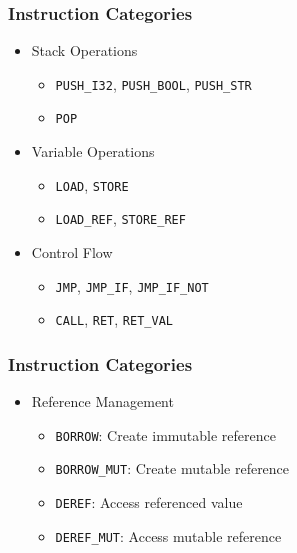 \documentclass{beamer}
\begin{document}
\begin{frame}
\frametitle{Instruction Categories}
\begin{itemize}
    \item Stack Operations
    \begin{itemize}
        \item \texttt{PUSH\_I32}, \texttt{PUSH\_BOOL}, \texttt{PUSH\_STR}
        \item \texttt{POP}
    \end{itemize}
    \item Variable Operations
    \begin{itemize}
        \item \texttt{LOAD}, \texttt{STORE}
        \item \texttt{LOAD\_REF}, \texttt{STORE\_REF}
    \end{itemize}
    \item Control Flow
    \begin{itemize}
        \item \texttt{JMP}, \texttt{JMP\_IF}, \texttt{JMP\_IF\_NOT}
        \item \texttt{CALL}, \texttt{RET}, \texttt{RET\_VAL}
    \end{itemize}
\end{itemize}
\end{frame}

\begin{frame}
\frametitle{Instruction Categories}
\begin{itemize}
    \item Reference Management
    \begin{itemize}
        \item \texttt{BORROW}: Create immutable reference
        \item \texttt{BORROW\_MUT}: Create mutable reference
        \item \texttt{DEREF}: Access referenced value
        \item \texttt{DEREF\_MUT}: Access mutable reference
    \end{itemize}
\end{itemize}
\end{frame}
\end{document}
